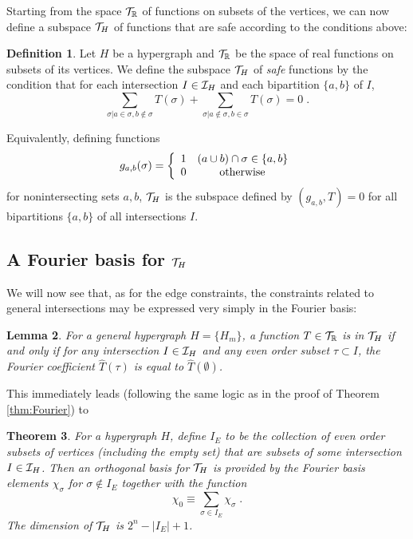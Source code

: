 \documentclass[12pt]{article}
\newtheorem{theorem}{Theorem}[section]
\newtheorem{lemma}[theorem]{Lemma}
\theoremstyle{definition}
\newtheorem{definition}[theorem]{Definition}
\begin{document}
Starting from the space ${\cal T}_\mathbb{R}$ of functions on subsets of the vertices, we can now define a subspace ${\cal T}_H$ of functions that are safe according to the conditions above:
\begin{definition}
    Let $H$ be a hypergraph and ${\cal T}_{\mathbb{R}}$ be the space of real functions on subsets of its vertices. We define the subspace ${\cal T}_H$ of {\it safe} functions by the condition that for each intersection $I \in {\cal I}_H$ and each bipartition $\{a,b\}$ of $I$, 
\begin{equation}
\label{gencond}
\sum_{\sigma | a \in \sigma, b \notin \sigma} T(\sigma) + \sum_{\sigma | a \notin \sigma, b \in \sigma} T(\sigma) = 0 \; .
\end{equation}
\end{definition}
Equivalently, defining functions
\[
g_{a,b}(\sigma) = \left\{ \begin{array}{ll} 1 & (a \cup b) \cap \sigma \in \{a,b\} \cr
0 & \qquad {\rm otherwise} \end{array}  \right.
\]
for nonintersecting sets $a,b$, ${\cal T}_H$ is the subspace defined by $(g_{a,b}, T) = 0$ for all bipartitions $\{a,b\}$ of all intersections $I$. 

\subsection{A Fourier basis for ${\cal T}_H$}

We will now see that, as for the edge constraints, the constraints related to general intersections may be expressed very simply in the Fourier basis:

\begin{lemma}
\label{FourLemma}
For a general hypergraph $H = \{H_m\}$, a function $T \in {\cal T}_\mathbb{R}$ is in ${\cal T}_H$ if and only if for any intersection $I \in {\cal I}_H$ and any even order subset $\tau \subset I$, the Fourier coefficient $\hat{T}(\tau)$ is equal to $\hat{T}(\emptyset)$. 
\end{lemma}
This immediately leads (following the same logic as in the proof of Theorem \ref{thm:Fourier}) to
\begin{theorem}\label{thm:Fourier2}
For a hypergraph $H$, define $I_E$ to be the collection of even order subsets of vertices (including the empty set) that are subsets of some intersection $I \in {\cal I}_H$. Then an orthogonal basis for ${\cal T}_H$ is provided by the Fourier basis elements $\chi_\sigma$ for $\sigma \notin I_E$ together with the function
\[
\chi_0 \equiv \sum_{\sigma \in I_E} \chi_\sigma \; . 
\]
The dimension of ${\cal T}_H$ is $2^n - |I_E| + 1$.
\end{theorem}
\end{document}
